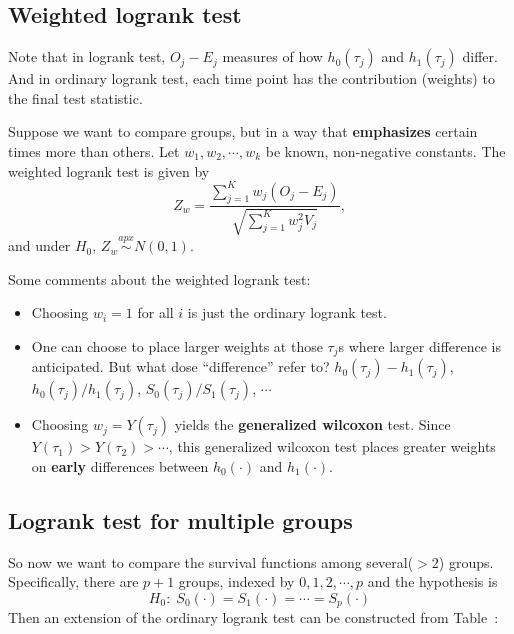 \documentclass[a4paper,12pt]{article}
\begin{document}
\subsection{Weighted logrank test}
\label{sec:weight-logr-test}

Note that in logrank test, $O_j - E_j$ measures of how $h_0\left(\tau_j\right)$ and $h_1\left(\tau_j\right)$ differ. And in ordinary logrank test, each time point has the contribution (weights) to the final test statistic.
\par
Suppose we want to compare groups, but in a way that \textbf{emphasizes} certain times more than others. Let $w_1, w_2, \cdots, w_k$ be known, non-negative constants. The weighted logrank test is given by
\[
  Z_w = \frac{\sum\limits_{j = 1}^Kw_j\left(O_j - E_j\right)}{
    \sqrt{\sum\limits_{j = 1}^Kw_j^2V_j}
  }
  ,
\]
and under $H_0$, $Z_w \overset{apx}{\sim}N\left(0, 1\right)$.
\par
Some comments about the weighted logrank test:
\begin{itemize}
\item Choosing $w_i = 1$ for all $i$ is just the ordinary logrank test.
\item One can choose to place larger weights at those $\tau_j$s where larger difference is anticipated. But what dose ``difference'' refer to? $h_0\left(\tau_j\right) - h_1\left(\tau_j\right)$, $h_0\left(\tau_j\right) / h_1\left(\tau_j\right)$, $S_0\left(\tau_j\right)/S_1\left(\tau_j\right)$, $\cdots$
\item Choosing $w_j = Y\left(\tau_j\right)$ yields the \textbf{generalized wilcoxon} test. Since $Y\left(\tau_1\right) > Y\left(\tau_2\right) > \cdots$, this generalized wilcoxon test places greater weights on \textbf{early} differences between $h_0\left(\cdot\right)$ and $h_1\left(\cdot\right)$.
\end{itemize}

\subsection{Logrank test for multiple groups}
\label{sec:logr-test-mult}

So now we want to compare the survival functions among several($>2$) groups. Specifically, there are $p+1$ groups, indexed by $0, 1, 2, \cdots, p$ and the hypothesis is
\[
  H_0:\;
  S_0\left(\cdot\right) = S_1\left(\cdot\right) = \cdots = S_p\left(\cdot\right)
\]
Then an extension of the ordinary logrank test can be constructed from Table~:
\end{document}
